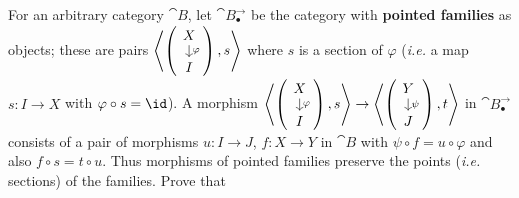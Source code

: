 \begin{exercise}
For an arbitrary category \(\cat{B}\), let \(\cat{B}_{\bullet}^{\rightarrow}\) be the category with \textbf{pointed families} as objects;
these are pairs \(\left\langle\begin{pmatrix}\begin{tikzcd}[row sep=small] X \arrow[d, "\varphi"] \\ I\end{tikzcd}\end{pmatrix}, s\right\rangle\) where \(s\) is a section of \(\varphi\)
(\emph{i.e.} a map \(s : I \to X\) with \(\varphi \circ s = \id\)).
A morphism \(\left\langle\begin{pmatrix}\begin{tikzcd}[row sep=small] X \arrow[d, "\varphi"] \\ I\end{tikzcd}\end{pmatrix}, s\right\rangle \to \left\langle\begin{pmatrix}\begin{tikzcd}[row sep=small] Y \arrow[d, "\psi"] \\ J\end{tikzcd}\end{pmatrix}, t\right\rangle\) in \(\cat{B}_{\bullet}^{\rightarrow}\) consists of a pair of morphisms \(u : I \to J\), \(f : X \to Y\) in \(\cat{B}\) with \(\psi \circ f = u \circ \varphi\) and also \(f \circ s = t \circ u\).
Thus morphisms of pointed families preserve the points (\emph{i.e.} sections) of the families.
Prove that
\end{exercise}

